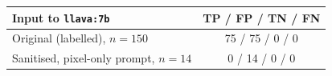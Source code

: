 \begin{tabular}{@{}lc@{}}
\toprule
Input to \texttt{llava:7b} & TP / FP / TN / FN \\
\midrule
Original (labelled), $n=150$ & 75 / 75 / 0 / 0 \\
Sanitised, pixel-only prompt, $n=14$ & 0 / 14 / 0 / 0 \\
\bottomrule
\end{tabular}
